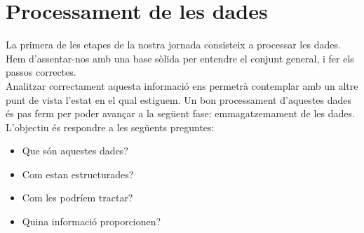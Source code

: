 \chapter{Processament de les dades}\label{ch:log-processing}

La primera de les etapes de la nostra jornada consisteix a processar les dades.
Hem d'assentar-nos amb una base sòlida per entendre el conjunt general, i fer els passos correctes. \\

\noindent
Analitzar correctament aquesta informació ens permetrà contemplar amb un altre punt de vista l'estat en el qual estiguem.
Un bon processament d'aquestes dades és pas ferm per poder avançar a la següent fase: emmagatzemament de les dades. \\

\noindent
L'objectiu és respondre a les següents preguntes:

\begin{itemize}
    \item Que són aquestes dades?
    \item Com estan estructurades?
    \item Com les podríem tractar?
    \item Quina informació proporcionen?
\end{itemize}


\clearpage

